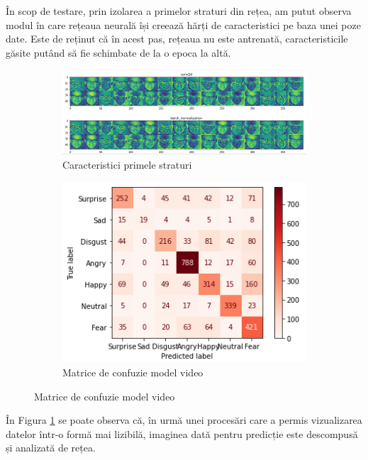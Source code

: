 \documentclass[a4paper, 12pt]{report}
\begin{document}
	În scop de testare, prin izolarea a primelor straturi din rețea, am putut observa modul în care rețeaua neurală își creează hărți de caracteristici pe baza unei poze date. Este de reținut că în acest pas, rețeaua nu este antrenată, caracteristicile găsite putând să fie schimbate de la o epoca la altă.
	
	\begin{figure}
		\centering
		\begin{subfigure}[b]{0.8\textwidth}
			 \includegraphics[width=1\linewidth]{images/video_model_layers_visualisation.png}
			\caption{Caracteristici primele straturi}
			\label{fig:video_model_layers_visualisation}
		\end{subfigure}
		\begin{subfigure}[b]{0.4\textwidth}
			 \includegraphics[width=1\linewidth]{images/video_confusion_matrix.png}
			\caption{Matrice de confuzie model video}
			\label{fig:video_confusion_matrix}
		\end{subfigure}
	\end{figure}

	În Figura \ref{fig:video_model_layers_visualisation} se poate observa că, în urmă unei procesări care a permis vizualizarea datelor într-o formă mai lizibilă, imaginea dată pentru predicție este descompusă și analizată de rețea.
\end{document}
